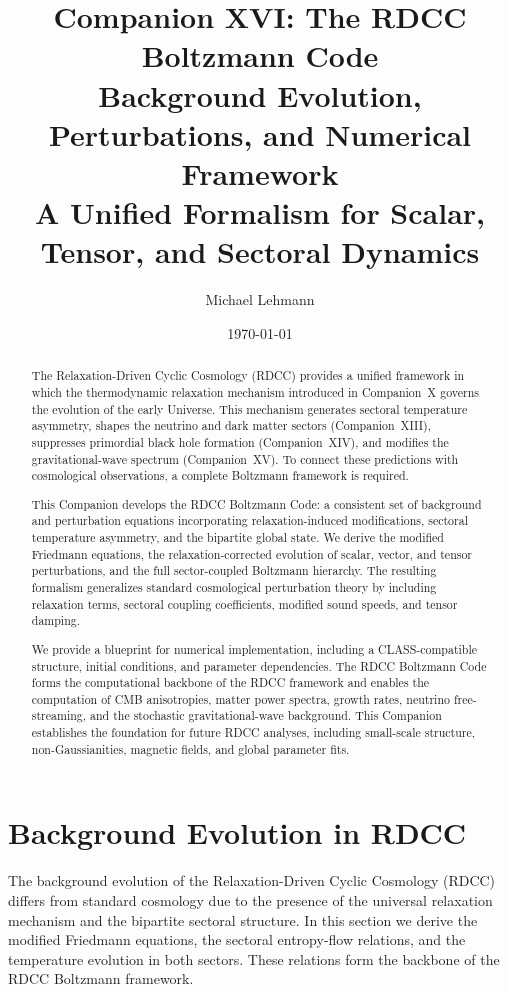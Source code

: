 \documentclass[11pt,a4paper]{article}
\title{\textbf{Companion XVI: The RDCC Boltzmann Code}\\
\textbf{Background Evolution, Perturbations, and Numerical Framework}\\
\textbf{A Unified Formalism for Scalar, Tensor, and Sectoral Dynamics}}
\author[1]{Michael Lehmann}
\affil[1]{\small Independent Researcher, Relaxation-Driven Cyclic Cosmology (RDCC) Framework\\
\texttt{mi.lehmann@gmx.de}}
\date{\small \today}
\begin{document}
\maketitle

\begin{abstract}
The Relaxation-Driven Cyclic Cosmology (RDCC) provides a unified framework in which the thermodynamic relaxation mechanism introduced in Companion~X governs the evolution of the early Universe. This mechanism generates sectoral temperature asymmetry, shapes the neutrino and dark matter sectors (Companion~XIII), suppresses primordial black hole formation (Companion~XIV), and modifies the gravitational-wave spectrum (Companion~XV). To connect these predictions with cosmological observations, a complete Boltzmann framework is required.

This Companion develops the RDCC Boltzmann Code: a consistent set of background and perturbation equations incorporating relaxation-induced modifications, sectoral temperature asymmetry, and the bipartite global state. We derive the modified Friedmann equations, the relaxation-corrected evolution of scalar, vector, and tensor perturbations, and the full sector-coupled Boltzmann hierarchy. The resulting formalism generalizes standard cosmological perturbation theory by including relaxation terms, sectoral coupling coefficients, modified sound speeds, and tensor damping.

We provide a blueprint for numerical implementation, including a CLASS-compatible structure, initial conditions, and parameter dependencies. The RDCC Boltzmann Code forms the computational backbone of the RDCC framework and enables the computation of CMB anisotropies, matter power spectra, growth rates, neutrino free-streaming, and the stochastic gravitational-wave background. This Companion establishes the foundation for future RDCC analyses, including small-scale structure, non-Gaussianities, magnetic fields, and global parameter fits.
\end{abstract}
\section{Background Evolution in RDCC}

The background evolution of the Relaxation-Driven Cyclic Cosmology (RDCC) differs from standard cosmology due to the presence of the universal relaxation mechanism and the bipartite sectoral structure. In this section we derive the modified Friedmann equations, the sectoral entropy-flow relations, and the temperature evolution in both sectors. These relations form the backbone of the RDCC Boltzmann framework.
\end{document}
